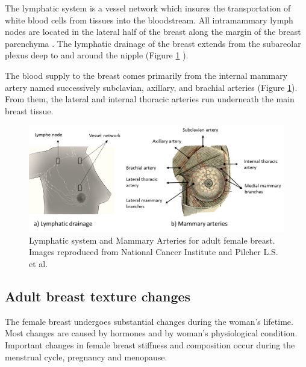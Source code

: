 The lymphatic system is a vessel network which insures the transportation of white blood cells from tissues into the bloodstream.  All intramammary lymph nodes are located in the lateral half of the breast along the margin of the breast parenchyma  \citep{kopans2007breast}.  The lymphatic drainage of the breast extends from the subareolar plexus deep to and around the nipple (Figure \ref{fig:lyphaticDrainageandArtery} ).

The blood supply to the breast comes primarily from the internal mammary artery named successively subclavian, axillary, and brachial arteries (Figure \ref{fig:lyphaticDrainageandArtery}). From them, the lateral and internal thoracic arteries run underneath the main breast tissue.

	
\begin{figure}[!h]
\centering
\includegraphics[width=\textwidth,keepaspectratio]{figures/lyphaticDrainageandArtery.PNG} 
\caption[Lymphatic system and Mammary Arteries for adult female breast. ]{Lymphatic system and Mammary Arteries for adult female breast.  Images reproduced from National Cancer Institute \citep{NCI_2012} and Pilcher L.S. et al. \citep{pilcher_breast_1917}}
\label{fig:lyphaticDrainageandArtery}
\end{figure}





\subsection{Adult breast texture changes}\label{subsection:adultbreasttexturechanges}

The female breast undergoes substantial changes during the woman's lifetime.  Most changes are caused by hormones and by woman's physiological condition. Important changes in female breast stiffness and composition occur during the menstrual cycle, pregnancy and menopause. 

